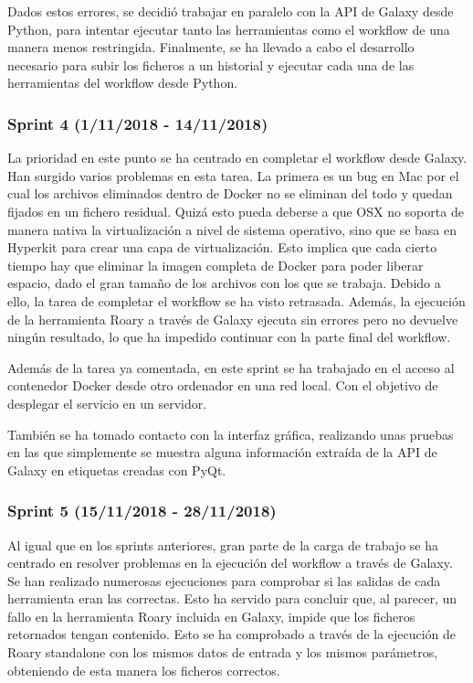 Dados estos errores, se decidió trabajar en paralelo con la API de Galaxy desde Python, para intentar ejecutar tanto las herramientas como el workflow de una manera menos restringida. Finalmente, se ha llevado a cabo el desarrollo necesario para subir los ficheros a un historial y ejecutar cada una de las herramientas del workflow desde Python.

\subsubsection{Sprint 4 (1/11/2018 - 14/11/2018)}
La prioridad en este punto se ha centrado en completar el workflow desde Galaxy. Han surgido varios problemas en esta tarea. La primera es un bug en Mac por el cual los archivos eliminados dentro de Docker no se eliminan del todo y quedan fijados en un fichero residual. Quizá esto pueda deberse a que OSX no soporta de manera nativa la virtualización a nivel de sistema operativo, sino que se basa en Hyperkit para crear una capa de virtualización. Esto implica que cada cierto tiempo hay que eliminar la imagen completa de Docker para poder liberar espacio, dado el gran tamaño de los archivos con los que se trabaja. Debido a ello, la tarea de completar el workflow se ha visto retrasada. Además, la ejecución de la herramienta Roary a través de Galaxy ejecuta sin errores pero no devuelve ningún resultado, lo que ha impedido continuar con la parte final del workflow. 

Además de la tarea ya comentada, en este sprint se ha trabajado en el acceso al contenedor Docker desde otro ordenador en una red local. Con el objetivo de desplegar el servicio en un servidor.

También se ha tomado contacto con la interfaz gráfica, realizando unas pruebas en las que simplemente se muestra alguna información extraída de la API de Galaxy en etiquetas creadas con PyQt.

\subsubsection{Sprint 5 (15/11/2018 - 28/11/2018)}
Al igual que en los sprints anteriores, gran parte de la carga de trabajo se ha centrado en resolver problemas en la ejecución del workflow a través de Galaxy. Se han realizado numerosas ejecuciones para comprobar si las salidas de cada herramienta eran las correctas. Esto ha servido para concluir que, al parecer, un fallo en la herramienta Roary incluida en Galaxy, impide que los ficheros retornados tengan contenido. Esto se ha comprobado a través de la ejecución de Roary standalone con los mismos datos de entrada y los mismos parámetros, obteniendo de esta manera los ficheros correctos.

